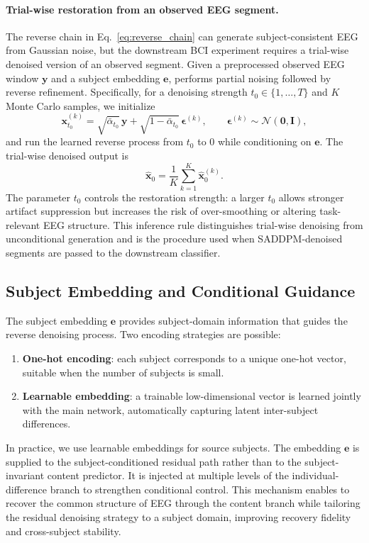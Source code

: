\paragraph{Trial-wise restoration from an observed EEG segment.}
The reverse chain in Eq.~\eqref{eq:reverse_chain} can generate subject-consistent EEG from Gaussian noise, but the downstream BCI experiment requires a
trial-wise denoised version of an observed segment. Given a preprocessed observed EEG window $\mathbf{y}$ and a subject embedding $\mathbf{e}$, \saddpm{} performs partial noising followed by reverse refinement. Specifically, for a denoising
strength $t_0\in\{1,\dots,T\}$ and $K$ Monte Carlo samples, we initialize
\begin{equation}
  \mathbf{x}^{(k)}_{t_0}=\sqrt{\bar{\alpha}_{t_0}}\,\mathbf{y}
  +\sqrt{1-\bar{\alpha}_{t_0}}\,\boldsymbol{\epsilon}^{(k)},
  \qquad \boldsymbol{\epsilon}^{(k)}\sim\mathcal{N}(\mathbf{0},\mathbf{I}),
  \label{eq:partial_noising}
\end{equation}
and run the learned reverse process from $t_0$ to $0$ while conditioning on $\mathbf{e}$. The trial-wise denoised output is
\begin{equation}
  \widehat{\mathbf{x}}_0 = \frac{1}{K}\sum_{k=1}^{K}\widehat{\mathbf{x}}^{(k)}_0.
  \label{eq:trialwise_output}
\end{equation}
The parameter $t_0$ controls the restoration strength: a larger $t_0$ allows stronger artifact suppression but increases the risk of over-smoothing or altering task-relevant EEG structure. This inference rule distinguishes trial-wise denoising from unconditional generation and is the procedure used when SADDPM-denoised segments are passed to the downstream classifier.

\subsection{Subject Embedding and Conditional Guidance}
\label{sec:method_embedding}

The subject embedding $\mathbf{e}$ provides subject-domain information that guides the reverse denoising process. Two encoding strategies are possible:
\begin{enumerate}
  \item \textbf{One-hot encoding}: each subject corresponds to a unique one-hot
  vector, suitable when the number of subjects is small.
  \item \textbf{Learnable embedding}: a trainable low-dimensional vector is
  learned jointly with the main network, automatically capturing latent
  inter-subject differences.
\end{enumerate}
In practice, we use learnable embeddings for source subjects. The embedding
$\mathbf{e}$ is supplied to the subject-conditioned residual path rather than to
the subject-invariant content predictor. It is injected at multiple levels of the
individual-difference branch to strengthen conditional control. This mechanism
enables \saddpm{} to recover the common structure of EEG through the content
branch while tailoring the residual denoising strategy to a subject domain,
improving recovery fidelity and cross-subject stability.

